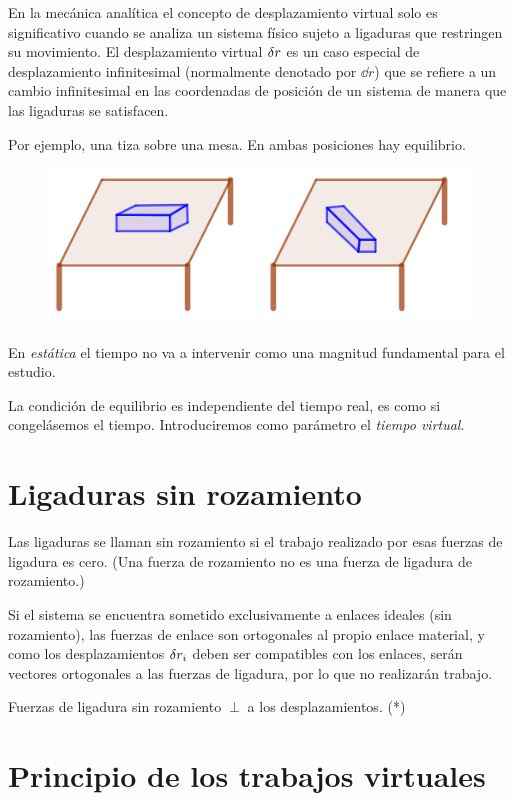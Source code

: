 En la mecánica analítica el concepto de desplazamiento virtual solo es significativo cuando se analiza un sistema físico sujeto a ligaduras que restringen su movimiento. El desplazamiento virtual $\var r$  es un caso especial de desplazamiento infinitesimal (normalmente denotado por $\dd r$) que se refiere a un cambio infinitesimal en las coordenadas de posición de un sistema de manera que las ligaduras se satisfacen.

\begin{multicols}{2}
Por ejemplo, una tiza sobre una mesa. En ambas posiciones hay equilibrio.

\begin{figure}[H]
	\centering
	\includegraphics[width=.4\textwidth]{imagenes/imagenes06/T06IM01.png}
\end{figure}
\end{multicols}

En \emph{estática} el tiempo no va a intervenir como una magnitud fundamental para el estudio.

La condición de equilibrio es independiente del tiempo real, es como si congelásemos el tiempo. Introduciremos como parámetro el \emph{tiempo virtual}.

\section{Ligaduras sin rozamiento}

Las ligaduras se llaman sin rozamiento si el trabajo realizado por esas fuerzas de ligadura es cero.  (Una fuerza de rozamiento no es una fuerza de ligadura de rozamiento.)


Si el sistema se encuentra sometido exclusivamente a enlaces ideales (sin rozamiento), las fuerzas de enlace son ortogonales al propio enlace material, y como los desplazamientos $\var r_i$ deben ser compatibles con los enlaces, serán vectores ortogonales a las fuerzas de ligadura, por lo que no realizarán trabajo.	

Fuerzas de ligadura sin rozamiento $\ \bot \ $ a los desplazamientos. (*)

\section{Principio de los trabajos virtuales}

